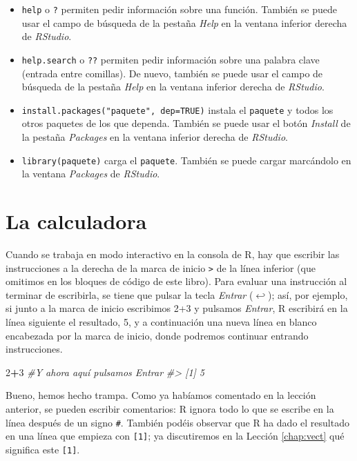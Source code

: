 \documentclass[
]{book}
\newenvironment{Shaded}{\begin{snugshade}}{\end{snugshade}}
\newcommand{\CommentTok}[1]{\textcolor[rgb]{0.56,0.35,0.01}{\textit{#1}}}
\newcommand{\DecValTok}[1]{\textcolor[rgb]{0.00,0.00,0.81}{#1}}
\newcommand{\OperatorTok}[1]{\textcolor[rgb]{0.81,0.36,0.00}{\textbf{#1}}}
\providecommand{\tightlist}{%
  \setlength{\itemsep}{0pt}\setlength{\parskip}{0pt}}
\theoremstyle{definition}
\theoremstyle{definition}
\theoremstyle{definition}
\theoremstyle{remark}
\begin{document}
\begin{itemize}
\tightlist
\item
  \texttt{help} o \texttt{?} permiten pedir información sobre una función. También se puede usar el campo de búsqueda de la pestaña \emph{Help} en la ventana inferior derecha de \emph{RStudio}.
\item
  \texttt{help.search} o \texttt{??} permiten pedir información sobre una palabra clave (entrada entre comillas). De nuevo, también se puede usar el campo de búsqueda de la pestaña \emph{Help} en la ventana inferior derecha de \emph{RStudio}.
\item
  \texttt{install.packages("paquete",\ dep=TRUE)} instala el \texttt{paquete} y todos los otros paquetes de los que dependa. También se puede usar el botón \emph{Install} de la pestaña \emph{Packages} en la ventana inferior derecha de \emph{RStudio}.
\item
  \texttt{library(paquete)} carga el \texttt{paquete}. También se puede cargar marcándolo en la ventana \emph{Packages} de \emph{RStudio}.
\end{itemize}

\hypertarget{chap:calc}{%
\chapter{La calculadora}\label{chap:calc}}

Cuando se trabaja en modo interactivo en la consola de R, hay que escribir las instrucciones a la derecha de la marca de inicio \texttt{\textgreater{}} de la línea inferior (que omitimos en los bloques de código de este libro).
Para evaluar una instrucción al terminar de escribirla, se tiene que pulsar la tecla \emph{Entrar} (\(\hookleftarrow\)); así, por ejemplo, si junto a la marca de inicio escribimos 2+3 y pulsamos \emph{Entrar}, R escribirá en la línea siguiente el resultado, 5, y a continuación una nueva línea en blanco encabezada por la marca de inicio, donde podremos continuar entrando instrucciones.

\begin{Shaded}
\begin{Highlighting}[]
\DecValTok{2}\OperatorTok{+}\DecValTok{3} \CommentTok{\#Y ahora aquí pulsamos Entrar}
\CommentTok{\#\textgreater{} [1] 5}
\end{Highlighting}
\end{Shaded}

Bueno, hemos hecho trampa. Como ya habíamos comentado en la lección anterior, se pueden escribir comentarios: R ignora todo lo que se escribe en la línea después de un signo \texttt{\#}. También podéis observar que R ha dado el resultado en una línea que empieza con \texttt{{[}1{]}}; ya discutiremos en la Lección \ref{chap:vect} qué significa este \texttt{{[}1{]}}.
\end{document}
